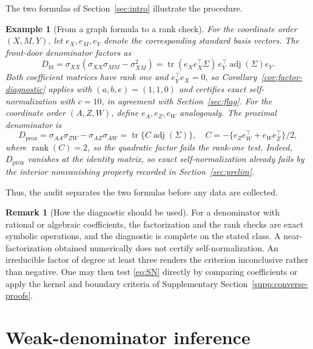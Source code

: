 \documentclass[12pt,a4paper]{article}
\theoremstyle{plain}
\newtheorem{example}{Example}
\theoremstyle{definition}
\newtheorem{remark}{Remark}
\newcommand{\tr}{\operatorname{tr}}
\newcommand{\adjm}{\operatorname{adj}}
\newcommand{\rank}{\operatorname{rank}}
\begin{document}
The two formulas of Section~\ref{sec:intro} illustrate the procedure.
\begin{example}[From a graph formula to a rank check]
\label{ex:factor-workflow}
    For the coordinate order $(X,M,Y)$, let $e_X,e_M,e_Y$ denote the corresponding standard basis vectors.
    The front-door denominator factors as
    \begin{equation}
    \label{eq:frontdoor-factor}
        D_{\mathrm{fd}}
        =
        \sigma_{XX}(\sigma_{XX}\sigma_{MM}-\sigma_{XM}^2)
        =
        \tr(e_Xe_X^\top\Sigma)\,e_Y^\top\adjm(\Sigma)e_Y
        .
    \end{equation}
    Both coefficient matrices have rank one and $e_Y^\top e_X=0$, so Corollary~\ref{cor:factor-diagnostic} applies with $(a,b,e)=(1,1,0)$ and certifies exact self-normalization with $c=10$, in agreement with Section~\ref{sec:flag}.
    For the coordinate order $(A,Z,W)$, define $e_A,e_Z,e_W$ analogously.
    The proximal denominator is
    \begin{equation}
    \label{eq:proximal-factor}
        D_{\mathrm{prox}}
        =
        \sigma_{AA}\sigma_{ZW}-\sigma_{AZ}\sigma_{AW}
        =
        \tr\{C\adjm(\Sigma)\}
        ,\quad
        C
        =
        -\{e_Ze_W^\top+e_We_Z^\top\}/2
        ,
    \end{equation}
    where $\rank(C)=2$, so the quadratic factor fails the rank-one test.
    Indeed, $D_{\mathrm{prox}}$ vanishes at the identity matrix, so exact self-normalization already fails by the interior nonvanishing property recorded in Section~\ref{sec:prelim}.
\end{example}
Thus, the audit separates the two formulas before any data are collected.

\begin{remark}[How the diagnostic should be used]
\label{rem:diagnostic-use}
    For a denominator with rational or algebraic coefficients, the factorization and the rank checks are exact symbolic operations, and the diagnostic is complete on the stated class.
    A near-factorization obtained numerically does not certify self-normalization.
    An irreducible factor of degree at least three renders the criterion inconclusive rather than negative.
    One may then test \eqref{eq:SN} directly by comparing coefficients or apply the kernel and boundary criteria of Supplementary Section~\ref{supp:converse-proofs}.
\end{remark}

\section{Weak-denominator inference}
\label{sec:weak}
\end{document}

